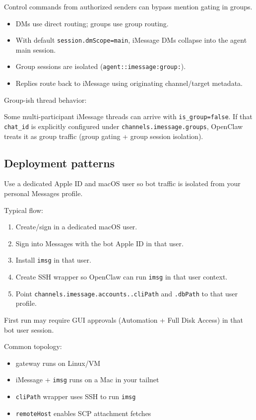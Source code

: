 Control commands from authorized senders can bypass mention gating in groups.


\begin{itemize}
  \item DMs use direct routing; groups use group routing.
  \item With default \texttt{session.dmScope=main}, iMessage DMs collapse into the agent main session.
  \item Group sessions are isolated (\texttt{agent::imessage:group:}).
  \item Replies route back to iMessage using originating channel/target metadata.
\end{itemize}


Group-ish thread behavior:

Some multi-participant iMessage threads can arrive with \texttt{is\_group=false}.
If that \texttt{chat\_id} is explicitly configured under \texttt{channels.imessage.groups}, OpenClaw treats it as group traffic (group gating + group session isolation).


\subsection{Deployment patterns}


Use a dedicated Apple ID and macOS user so bot traffic is isolated from your personal Messages profile.

Typical flow:

\begin{enumerate}
  \item Create/sign in a dedicated macOS user.
  \item Sign into Messages with the bot Apple ID in that user.
  \item Install \texttt{imsg} in that user.
  \item Create SSH wrapper so OpenClaw can run \texttt{imsg} in that user context.
  \item Point \texttt{channels.imessage.accounts..cliPath} and \texttt{.dbPath} to that user profile.
\end{enumerate}


First run may require GUI approvals (Automation + Full Disk Access) in that bot user session.


Common topology:

\begin{itemize}
  \item gateway runs on Linux/VM
  \item iMessage + \texttt{imsg} runs on a Mac in your tailnet
  \item \texttt{cliPath} wrapper uses SSH to run \texttt{imsg}
  \item \texttt{remoteHost} enables SCP attachment fetches
\end{itemize}


